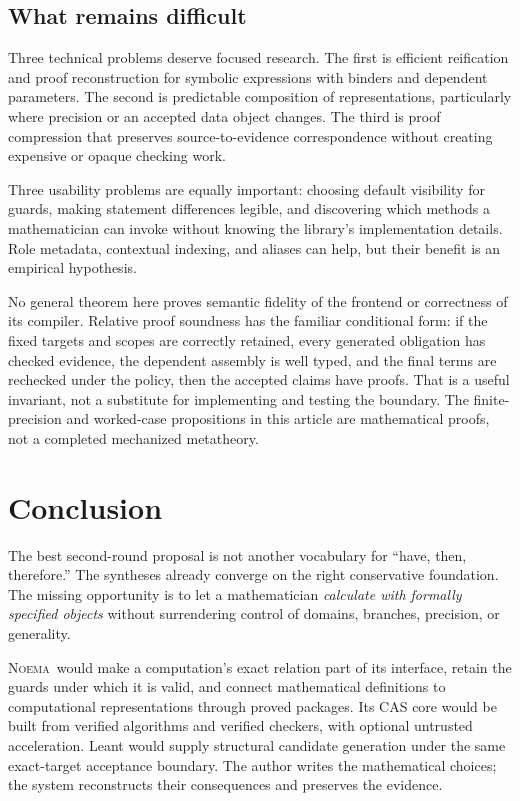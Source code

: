 \documentclass[11pt,a4paper]{article}
\newcommand{\Noema}{\textsc{Noema}}
\theoremstyle{remark}\newtheorem{example}[proposition]{Example}
\begin{document}
\subsection{What remains difficult}
Three technical problems deserve focused research. The first is efficient reification and proof reconstruction for symbolic expressions with binders and dependent parameters. The second is predictable composition of representations, particularly where precision or an accepted data object changes. The third is proof compression that preserves source-to-evidence correspondence without creating expensive or opaque checking work.

Three usability problems are equally important: choosing default visibility for guards, making statement differences legible, and discovering which methods a mathematician can invoke without knowing the library's implementation details. Role metadata, contextual indexing, and aliases can help, but their benefit is an empirical hypothesis.

No general theorem here proves semantic fidelity of the frontend or correctness of its compiler. Relative proof soundness has the familiar conditional form: if the fixed targets and scopes are correctly retained, every generated obligation has checked evidence, the dependent assembly is well typed, and the final terms are rechecked under the policy, then the accepted claims have proofs. That is a useful invariant, not a substitute for implementing and testing the boundary. The finite-precision and worked-case propositions in this article are mathematical proofs, not a completed mechanized metatheory.

\clearpage
\section{Conclusion}
The best second-round proposal is not another vocabulary for ``have, then, therefore.'' The syntheses already converge on the right conservative foundation. The missing opportunity is to let a mathematician \emph{calculate with formally specified objects} without surrendering control of domains, branches, precision, or generality.

\Noema\ would make a computation's exact relation part of its interface, retain the guards under which it is valid, and connect mathematical definitions to computational representations through proved packages. Its CAS core would be built from verified algorithms and verified checkers, with optional untrusted acceleration. Leant would supply structural candidate generation under the same exact-target acceptance boundary. The author writes the mathematical choices; the system reconstructs their consequences and preserves the evidence.
\end{document}
